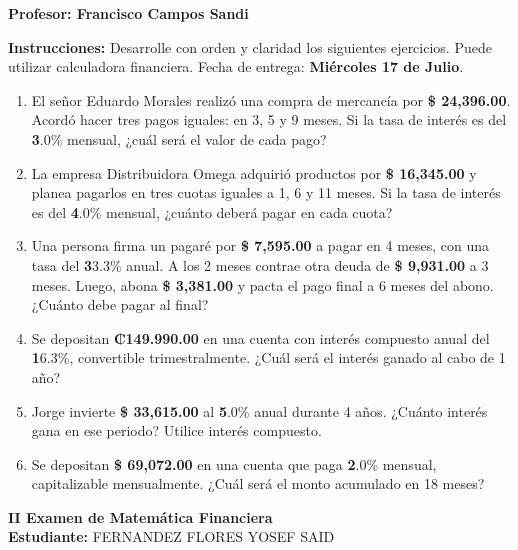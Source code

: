 \documentclass[14pt]{article}
\begin{document}
\vspace{1cm}

\textbf{Profesor: Francisco Campos Sandi}

\textbf{Instrucciones:} Desarrolle con orden y claridad los siguientes ejercicios. Puede utilizar calculadora financiera. Fecha de entrega: \textbf{Miércoles 17 de Julio}.

\begin{enumerate}
  \item El señor Eduardo Morales realizó una compra de mercancía por \textbf{\$ 24,396.00}. Acordó hacer tres pagos iguales: en 3, 5 y 9 meses. Si la tasa de interés es del \textbf3.0\% mensual, ¿cuál será el valor de cada pago?

  \item La empresa Distribuidora Omega adquirió productos por \textbf{\$ 16,345.00} y planea pagarlos en tres cuotas iguales a 1, 6 y 11 meses. Si la tasa de interés es del \textbf4.0\% mensual, ¿cuánto deberá pagar en cada cuota?

  \item Una persona firma un pagaré por \textbf{\$ 7,595.00} a pagar en 4 meses, con una tasa del \textbf33.3\% anual. A los 2 meses contrae otra deuda de \textbf{\$ 9,931.00} a 3 meses. Luego, abona \textbf{\$ 3,381.00} y pacta el pago final a 6 meses del abono. ¿Cuánto debe pagar al final?

  \item Se depositan \textbf{₡149.990.00} en una cuenta con interés compuesto anual del \textbf16.3\%, convertible trimestralmente. ¿Cuál será el interés ganado al cabo de 1 año?

  \item Jorge invierte \textbf{\$ 33,615.00} al \textbf5.0\% anual durante 4 años. ¿Cuánto interés gana en ese periodo? Utilice interés compuesto.

  \item Se depositan \textbf{\$ 69,072.00} en una cuenta que paga \textbf2.0\% mensual, capitalizable mensualmente. ¿Cuál será el monto acumulado en 18 meses?
\end{enumerate}
\newpage

\begin{center}
    {\LARGE \textbf{II Examen de Matemática Financiera}}\\[1em]
    {\large \textbf{Estudiante:} FERNANDEZ FLORES YOSEF SAID}
\end{center}

\vspace{1cm}
\end{document}
